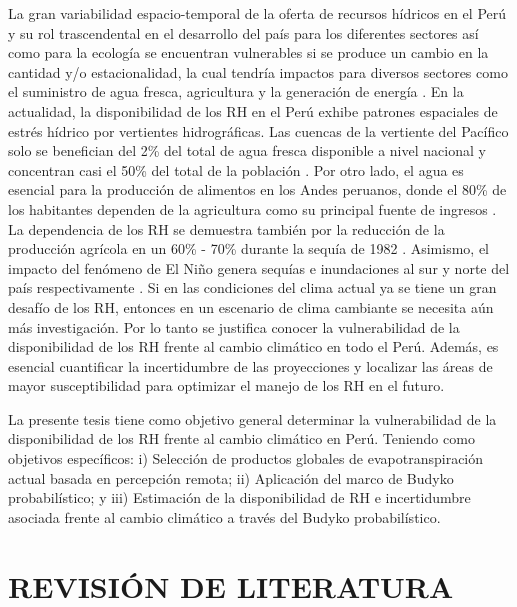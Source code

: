 \documentclass[12pt]{article}
\begin{document}
La gran variabilidad espacio-temporal de la oferta de recursos hídricos en el Perú y su rol trascendental en el desarrollo del país para los diferentes sectores así como para la ecología se encuentran vulnerables si se produce un cambio en la cantidad y/o estacionalidad, la cual tendría impactos para diversos sectores como el suministro de agua fresca, agricultura y la generación de energía \citep{barnett2005potential,vergara2007economic,salzmann2009integrated}. En la actualidad, la disponibilidad de los RH en el Perú exhibe patrones espaciales de estrés hídrico por vertientes hidrográficas. Las cuencas de la vertiente del Pacífico solo se benefician del 2\% del total de agua fresca disponible a nivel nacional y concentran casi el 50\% del total de la población \citep{rau2018hydroclimatic}. Por otro lado, el agua es esencial para la producción de alimentos en los Andes peruanos, donde el 80\% de los habitantes dependen de la agricultura como su principal fuente de ingresos \citep{lasage2015stepwise}. La dependencia de los RH se demuestra también por la reducción de la producción agrícola en un 60\% - 70\% durante la sequía de 1982 \citep{zimmerer1999overlapping}. Asimismo, el impacto del fenómeno de El Niño genera sequías e inundaciones al sur y norte del país respectivamente \citep{lavado2014impactos,Huerta2019a}. Si en las condiciones del clima actual ya se tiene un gran desafío de los RH, entonces en un escenario de clima cambiante se necesita aún más investigación. Por lo tanto se justifica conocer la vulnerabilidad de la disponibilidad de los RH frente al cambio climático en todo el Perú. Además, es esencial cuantificar la incertidumbre de las proyecciones y localizar las áreas de mayor susceptibilidad para optimizar el manejo de los RH en el futuro.

La presente tesis tiene como objetivo general determinar la vulnerabilidad de la disponibilidad de los RH frente al cambio climático en Perú. Teniendo como objetivos específicos: i) Selección de productos globales de evapotranspiración actual basada en percepción remota; ii) Aplicación del marco de Budyko probabilístico; y iii) Estimación de la disponibilidad de RH e incertidumbre asociada frente al cambio climático a través del Budyko probabilístico.


\clearpage
\vspace*{0.5mm}
\section{REVISIÓN DE LITERATURA}
\end{document}
